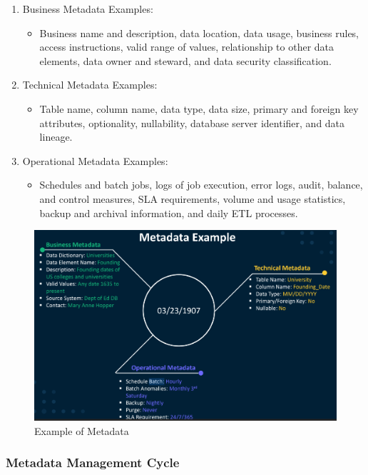 \begin{enumerate}
    \item Business Metadata Examples:
    \begin{itemize}
        \item Business name and description, data location, data usage, business rules, access instructions, valid range of values, relationship to other data elements, data owner and steward, and data security classification.
    \end{itemize}
    \item Technical Metadata Examples: 
    \begin{itemize}
        \item Table name, column name, data type, data size, primary and foreign key attributes, optionality, nullability, database server identifier, and data lineage.
    \end{itemize}
    \item Operational Metadata Examples:
    \begin{itemize}
        \item Schedules and batch jobs, logs of job execution, error logs, audit, balance, and control measures, SLA requirements, volume and usage statistics, backup and archival information, and daily ETL processes.
    \end{itemize}
\end{enumerate}

\begin{figure}[H]
    \centering
    \includegraphics[scale=0.60]{images/Metadata Example.png}
    \caption{Example of Metadata}
    \label{Metadata Example}
\end{figure}

\subsubsection{Metadata Management Cycle}

